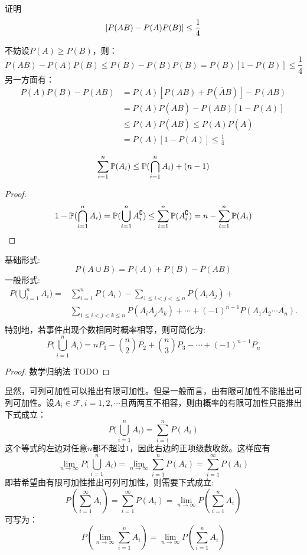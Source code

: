 \begin{example}[]\label{ex:inequality_event}
    证明
    \[ \abs{P(AB) - P(A)P(B)} \le \frac1{4} \]
\end{example}
\begin{solution}
    不妨设$P(A)\ge P(B)$，则：
    \[ P(AB)-P(A)P(B)\le P(B)-P(B)P(B)=P(B)[1-P(B)]\le \frac1{4} \]
    另一方面有：
    \begin{align*}
        P(A)P(B)-P(AB) & =P(A)[P(AB)+P(\overline{A}B)]-P(AB)              \\
                       & =P(A)P(\overline{A}B)-P(AB)[1-P(A)]              \\
                       & \le P(A)P(\overline{A}B) \le P(A)P(\overline{A}) \\
                       & =P(A)[1-P(A)]\le \frac1{4}
    \end{align*}
\end{solution}

\begin{corollary}
    \[ \sum_{i=1}^n \P(A_i) \le \P(\bigcap_{i=1}^{n}A_i) + (n-1) \]
\end{corollary}
\begin{proof}
    \[ 1-\P(\bigcap_{i=1}^{n}A_i) = \P(\bigcup_{i=1}^{n}A_i^{\complement}) \le \sum_{i=1}^n \P(A_i^{\complement}) = n - \sum_{i=1}^n \P(A_i) \]
\end{proof}

\begin{proposition}[加法公式]\label{pro:addition_law}
    基础形式:
    \[ P(A \cup B) = P(A) + P(B) - P(AB) \]
    一般形式:
    \begin{align*}
        P\biggl(\bigcup_{i=1}^n A_i \biggr)= & \sum_{i=1}^n P(A_i) - \sum_{1\le i < j < \le n}P(A_i A_j)+                              \\
                                             & \sum_{1 \le i < j < k \le n} P(A_i A_j A_k)+ \dotsb + (-1)^{n-1} P(A_1 A_2 \dotsb A_n). \\
    \end{align*}
    特别地，若事件出现个数相同时概率相等，则可简化为:
    \[ P\biggl( \bigcup_{i=1}^n A_i \biggr)=n P_{1} - \binom{n}{2} P_{2} + \binom{n}{3} P_{3}- \cdots+(-1)^{n-1} P_{n} \]
\end{proposition}
\begin{proof}
    数学归纳法
    TODO
\end{proof}

显然，可列可加性可以推出有限可加性。但是一般而言，由有限可加性不能推出可列可加性。设$A_i \in \mathscr{F}, i=1,2,\cdots$且两两互不相容，则由概率的有限可加性只能推出下式成立：
\[ P\biggl( \bigcup_{i=1}^n A_i \biggr)=\sum_{i=1}^n P(A_i) \]
这个等式的左边对任意$n$都不超过$1$，因此右边的正项级数收敛。这样应有
\[ \lim_{n \to \infty}P\biggl(\bigcup_{i=1}^n A_i \biggr) =\lim_{n \to \infty}\sum_{i=1}^n P(A_i)=\sum_{i=1}^{\infty} P(A_i) \]
即若希望由有限可加性推出可列可加性，则需要下式成立:
\[ P(\sum_{i=1}^{\infty} A_i)=\sum_{i=1}^{\infty} P(A_i)=\lim_{n \to \infty}P(\sum_{i=1}^n A_i) \]
可写为：
\[ P(\lim_{n \to \infty}\sum_{i=1}^{n} A_i)=\lim_{n \to \infty}P(\sum_{i=1}^n A_i) \]

